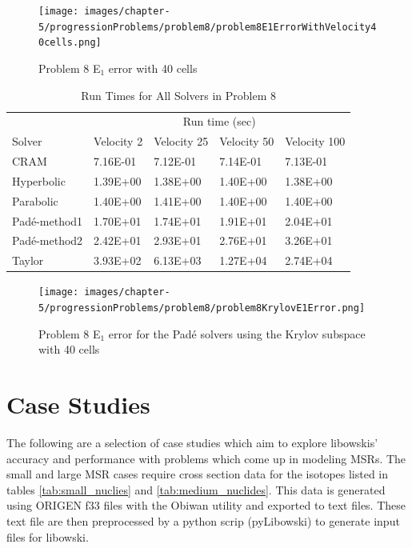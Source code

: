 \clearpage

\begin{figure}[p]
    \centering
    \texttt{[image: images/chapter-5/progressionProblems/problem8/problem8E1ErrorWithVelocity40cells.png]}
    \caption{Problem 8 E${}_{1}$ error with 40 cells}
    \label{fig:problem8_E1_error_40cells}
\end{figure}

\clearpage

\begin{table}[p]
   \caption{\label{tab:problem8_run_times} Run Times for All Solvers in Problem 8}
   \centering
   \begin{tabular}{lllll}
   \hline
    \multicolumn{1}{c}{} & \multicolumn{4}{c}{Run time (sec)}  \\
    Solver & Velocity 2 & Velocity 25 & Velocity 50 & Velocity 100 \\
   \hline
	CRAM & 7.16E-01 & 7.12E-01	& 7.14E-01 & 7.13E-01 \\
	Hyperbolic & 1.39E+00 & 1.38E+00	& 1.40E+00 & 1.38E+00 \\
	Parabolic & 1.40E+00 & 1.41E+00	& 1.40E+00 & 1.40E+00 \\
	Pad\'e-method1 & 1.70E+01 & 1.74E+01	& 1.91E+01 & 2.04E+01 \\
	Pad\'e-method2 & 2.42E+01 & 2.93E+01	& 2.76E+01 & 3.26E+01 \\
	Taylor & 3.93E+02 & 6.13E+03	& 1.27E+04 & 2.74E+04 \\
   \hline
   \end{tabular}
\end{table}  

\clearpage

\begin{figure}[p]
    \centering
    \texttt{[image: images/chapter-5/progressionProblems/problem8/problem8KrylovE1Error.png]}
    \caption{Problem 8 E${}_{1}$ error for the Pad\'e solvers using the Krylov subspace with 40 cells}
    \label{fig:problem8_E1_error_krylov}
\end{figure}

\clearpage

\section{Case Studies}
The following are a selection of case studies which aim to explore libowskis' accuracy and performance with problems which come up in modeling MSRs. The small and large MSR cases require cross section data for the isotopes listed in tables \ref{tab:small_nuclies} and \ref{tab:medium_nuclides}. This data is generated using ORIGEN f33 files with the Obiwan utility and exported to text files. These text file are then preprocessed by a python scrip (pyLibowski) to generate input files for libowski. 

